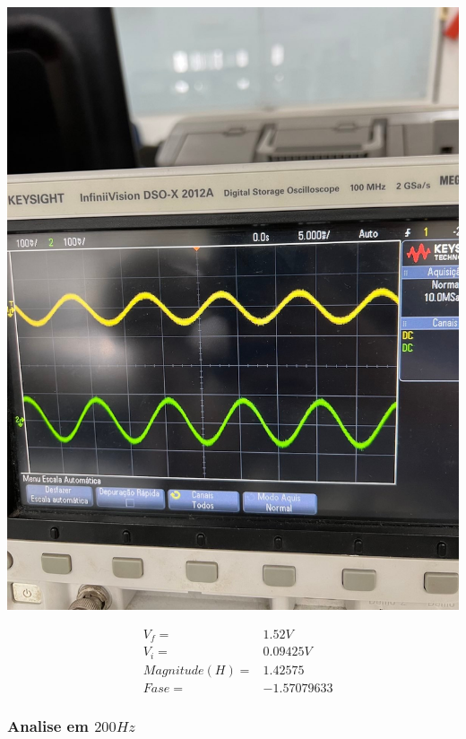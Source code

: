 \documentclass[12pt,twoside, a4paper, twocolumn]{article}
\begin{document}
\begin{adjustbox}{scale=0.18}
    \includegraphics{freq100.jpeg}
\end{adjustbox}


\begin{equation*}
    \begin{aligned}
         & V_f =          & 1.52V       \\
         & V_i =          & 0.09425V    \\
         & Magnitude(H) = & 1.42575     \\
         & Fase =         & -1.57079633
    \end{aligned}
\end{equation*}


\subsubsection{Analise em $200Hz$}
\subparagraph*{}
\end{document}
